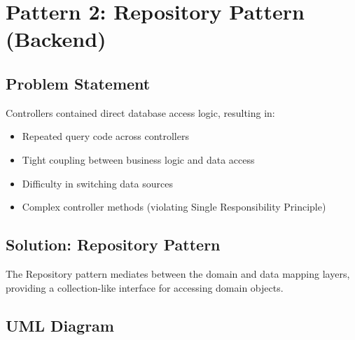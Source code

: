 \documentclass[12pt,a4paper]{article}
\begin{document}
\newpage

\section{Pattern 2: Repository Pattern (Backend)}

\subsection{Problem Statement}

Controllers contained direct database access logic, resulting in:
\begin{itemize}
    \item Repeated query code across controllers
    \item Tight coupling between business logic and data access
    \item Difficulty in switching data sources
    \item Complex controller methods (violating Single Responsibility Principle)
\end{itemize}

\subsection{Solution: Repository Pattern}

The Repository pattern mediates between the domain and data mapping layers, providing a collection-like interface for accessing domain objects.

\subsection{UML Diagram}
\end{document}
